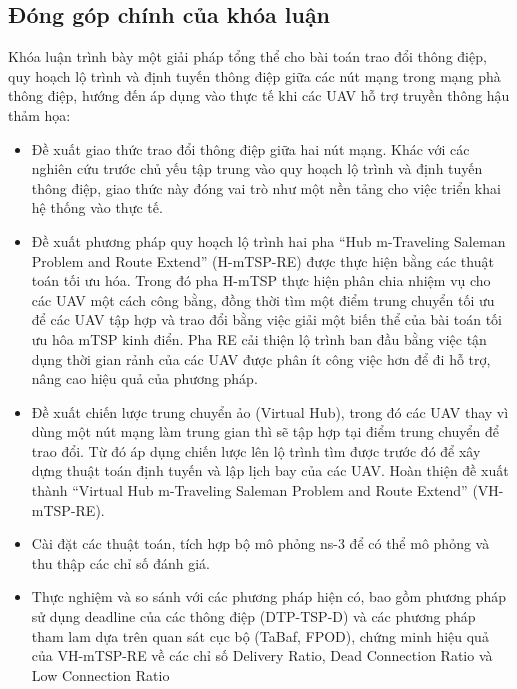 \documentclass[a4paper]{article}
\begin{document}
\subsection{Đóng góp chính của khóa luận}
Khóa luận trình bày một giải pháp tổng thể cho bài toán trao đổi thông điệp, quy hoạch lộ trình và định tuyến thông điệp giữa các nút mạng trong mạng phà thông điệp, hướng đến áp dụng vào thực tế khi các UAV hỗ trợ truyền thông hậu thảm họa:
\begin{itemize}
  \item Đề xuất giao thức trao đổi thông điệp giữa hai nút mạng. Khác với các nghiên cứu trước chủ yếu tập trung vào quy hoạch lộ trình và định tuyến thông điệp, giao thức này đóng vai trò như một nền tảng cho việc triển khai hệ thống vào thực tế.
  \item Đề xuất phương pháp quy hoạch lộ trình hai pha ``Hub m-Traveling Saleman Problem and Route Extend'' (H-mTSP-RE) được thực hiện bằng các thuật toán tối ưu hóa. Trong đó pha H-mTSP thực hiện phân chia nhiệm vụ cho các UAV một cách công bằng, đồng thời tìm một điểm trung chuyển tối ưu để các UAV tập hợp và trao đổi bằng việc giải một biến thể của bài toán tối ưu hôa mTSP kinh điển. Pha RE cải thiện lộ trình ban đầu bằng việc tận dụng thời gian rảnh của các UAV được phân ít công việc hơn để đi hỗ trợ, nâng cao hiệu quả của phương pháp.
  \item Đề xuất chiến lược trung chuyển ảo (Virtual Hub), trong đó các UAV thay vì dùng một nút mạng làm trung gian thì sẽ tập hợp tại điểm trung chuyển để trao đổi. Từ đó áp dụng chiến lược lên lộ trình tìm được trước đó để xây dựng thuật toán định tuyến và lập lịch bay của các UAV. Hoàn thiện đề xuất thành ``Virtual Hub m-Traveling Saleman Problem and Route Extend'' (VH-mTSP-RE).

  \item Cài đặt các thuật toán, tích hợp bộ mô phỏng ns-3 để có thể mô phỏng và thu thập các chỉ số đánh giá.
  \item Thực nghiệm và so sánh với các phương pháp hiện có, bao gồm phương pháp sử dụng deadline của các thông điệp (DTP-TSP-D) và các phương pháp tham lam dựa trên quan sát cục bộ (TaBaf, FPOD), chứng minh hiệu quả của VH-mTSP-RE về các chỉ số Delivery Ratio, Dead Connection Ratio và Low Connection Ratio
\end{itemize}
\end{document}
